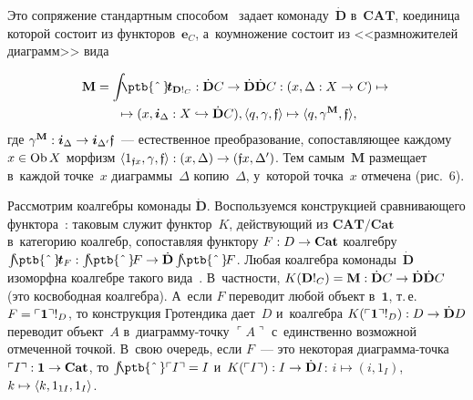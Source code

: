 \begin{multicols}{2}
     Это сопряжение стандартным способом~\cite[\S\,VI.1]{8-kov} задает 
комонаду~$\dot{\mathbf{D}}$ в~$\mathbf{CAT}$, коединица которой состоит 
из функторов~$\bm{e}_C$, а~коумножение состоит из <<размножителей 
диаграмм>> вида

\noindent
\begin{multline*}
\mathbf{M} = \int {\mbox{\!\!\!\ptb{\^{\,}}}} \!\bm{t}_{\mathbf{D}!_C} : 
\dot{\mathbf{D}}C \to \dot{\mathbf{D}} \dot{\mathbf{D}}C : (x, \Delta : X \to C) 
\mapsto {}\\
{}\mapsto (x, \bm{i}_\Delta : X \hookrightarrow  \dot{\mathbf{D}}C), \langle q, 
\gamma, \mathfrak{f}\rangle \mapsto  \langle q, \gamma^{\mathbf{M}}, 
\mathfrak{f}\rangle,
\end{multline*}
где $\gamma^{\mathbf{M}} : \bm{i}_\Delta \hm\to  
\bm{i}_{\Delta^\prime}\mathfrak{f}$~--- естественное преобразование, 
сопоставляющее каждому $x \hm\in \mathrm{Ob}\,X$ морфизм $\langle 
1_{\mathfrak{f}x}, \gamma, \mathfrak{f}\rangle : (x, \Delta) \hm\to  (\mathfrak{f}x, 
\Delta^\prime)$. Тем самым~$\mathbf{M}$ размещает в~каждой точке~$x$ 
диаграммы~$\Delta$ копию~$\Delta$, у~которой точка~$x$ отмечена (рис.~6).


     Рассмотрим коалгебры комонады $\dot{\mathbf{D}}$. Воспользуемся 
конструкцией сравнивающего функтора~\cite[\S\,~VI.3]{8-kov}: таковым 
служит функтор~$K$, действующий из $\mathbf{CAT}/\mathbf{Cat}$ 
в~категорию коалгебр, сопоставляя функтору $F : D \hm\to \mathbf{Cat}$ 
коалгебру $\int {\mbox{\!\!\!\ptb{\^{\,}}}}\! \bm{t}_F: \int 
{\mbox{\!\!\!\ptb{\^{\,}}}} \!F \hm\to  \dot{\mathbf{D}} 
\int{\mbox{\!\!\!\ptb{\^{\,}}}} \!F$. Любая коалгебра 
комонады~$\dot{\mathbf{D}}$ изоморфна коалгебре такого вида~\cite{6-kov}. 
В~частности, $K(\mathbf{D}!_C) \hm= \mathbf{M} : \dot{\mathbf{D}}C \hm\to 
\dot{\mathbf{D}}\dot{\mathbf{D}}C$ (это косвободная коалгебра). А~если $F$ 
переводит любой объект в~$\bm{1}$, т.\,е.\ $F \hm= \ulcorner \bm{1}\urcorner 
!_D$, то конструкция Гротендика дает~$D$ и~коалгебра $K(\ulcorner 
\bm{1}\urcorner !_D) : D \hm\to  \dot{\mathbf{D}}D$ переводит объект~$A$ 
в~диа\-грам\-му-точ\-ку $\ulcorner A\urcorner$ с~единственно возможной 
отмеченной точкой. В~свою очередь, если $F$~--- это некоторая  
диа\-грам\-ма-точ\-ка $\ulcorner I\urcorner : \bm{1}\hm\to \mathbf{Cat}$, то $\int 
{\mbox{\!\!\!\ptb{\^{\,}}}} \ulcorner I\urcorner \hm = I$ и~$K(\ulcorner 
I\urcorner) : I \hm\to \dot{\mathbf{D}}I$: $i \mapsto (i, 1_I)$, $k \hm\mapsto \langle 
k, 1_{1I}, 1_I\rangle$.
     

\end{multicols}
